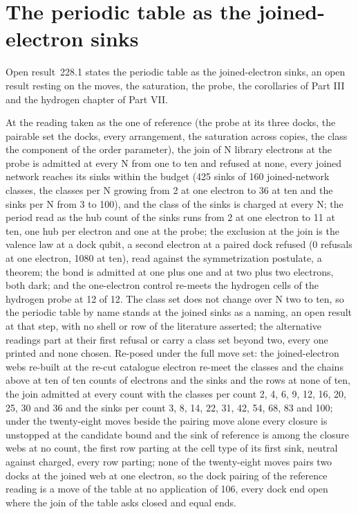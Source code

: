 \section{The periodic table as the joined-electron sinks}\label{mod:XII-5-periodic-table-as-the-joined-electron-sinks}
\label{narr:open:12-5}Open result~228.1 states the periodic table as the joined-electron sinks, an open result resting on the moves, the saturation, the probe, the corollaries of Part III and the hydrogen chapter of Part VII.
\begin{chwall}\label{box:XII-5-periodic-table-as-the-joined-electron-sinks:1}
At the reading taken as the one of reference (the probe at its three docks, the pairable set the docks, every arrangement, the saturation across copies, the class the component of the order parameter), the join of N library electrons at the probe is admitted at every N from one to ten and refused at none, every joined network reaches its sinks within the budget (425 sinks of 160 joined-network classes, the classes per N growing from 2 at one electron to 36 at ten and the sinks per N from 3 to 100), and the class of the sinks is charged at every N; the period read as the hub count of the sinks runs from 2 at one electron to 11 at ten, one hub per electron and one at the probe; the exclusion at the join is the valence law at a dock qubit, a second electron at a paired dock refused (0 refusals at one electron, 1080 at ten), read against the symmetrization postulate, a theorem; the bond is admitted at one plus one and at two plus two electrons, both dark; and the one-electron control re-meets the hydrogen cells of the hydrogen probe at 12 of 12. The class set does not change over N two to ten, so the periodic table by name stands at the joined sinks as a naming, an open result at that step, with no shell or row of the literature asserted; the alternative readings part at their first refusal or carry a class set beyond two, every one printed and none chosen.
Re-posed under the full move set: the joined-electron webs re-built at the re-cut catalogue electron re-meet the classes and the chains above at ten of ten counts of electrons and the sinks and the rows at none of ten, the join admitted at every count with the classes per count 2, 4, 6, 9, 12, 16, 20, 25, 30 and 36 and the sinks per count 3, 8, 14, 22, 31, 42, 54, 68, 83 and 100; under the twenty-eight moves beside the pairing move alone every closure is unstopped at the candidate bound and the sink of reference is among the closure webs at no count, the first row parting at the cell type of its first sink, neutral against charged, every row parting; none of the twenty-eight moves pairs two docks at the joined web at one electron, so the dock pairing of the reference reading is a move of the table at no application of 106, every dock end open where the join of the table asks closed and equal ends.
\end{chwall}
